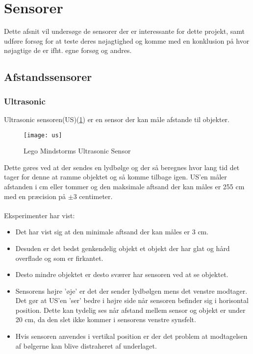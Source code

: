 \section{Sensorer}
Dette afsnit vil undersøge de sensorer der er interessante for dette projekt, samt udføre forsøg for at teste deres nøjagtighed og komme med en konklusion på hvor nøjagtige de er ifht. egne forsøg og andres.

\subsection{Afstandssensorer}
\subsubsection{Ultrasonic}
Ultrasonic sensoren(US)(\cref{sensor:ultrasonic_sensor}) er en sensor der kan måle afstande til objekter.

\begin{figure}[h]
\centering
\texttt{[image: us]}
\caption{Lego Mindstorms Ultrasonic Sensor}
\label{sensor:ultrasonic_sensor}
\end{figure}

Dette gøres ved at der sendes en lydbølge og der så beregnes hvor lang tid det tager for denne at ramme objektet og så komme tilbage igen.
US'en måler afstanden i cm eller tommer og den maksimale aftsand der kan måles er 255 cm med en præcision på $\pm$3 centimeter.\cite{tikNXT}
\\
\\
Eksperimenter\cite{tikNXT} har vist:
\begin{itemize}
\item Det har vist sig at den minimale aftsand der kan måles er 3 cm.
\item Desuden er det bedst genkendelig objekt et objekt der har glat og hård overflade og som er firkantet.
\item Desto mindre objektet er desto sværer har sensoren ved at se objektet.
\item Sensorens højre 'øje' er det der sender lydbølgen mens det venstre modtager.
Det gør at US'en 'ser' bedre i højre side når sensoren befinder sig i horisontal position.
Dette kan tydelig ses når afstand mellem sensor og objekt er under 20 cm, da den slet ikke kommer i sensorens venstre synsfelt.
\item Hvis sensoren anvendes i vertikal position er der det problem at modtagelsen af bølgerne kan blive distraheret af underlaget.
\end{itemize}

